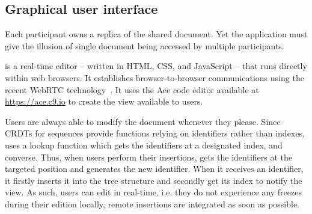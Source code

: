 \subsection{Graphical user interface}

Each participant owns a replica of the shared document. Yet the application must
give the illusion of single document being accessed by multiple
participants.

\CRATE is a real-time editor -- written in HTML, CSS, and JavaScript -- that
runs directly within web browsers. It establishes browser-to-browser
communications using the recent WebRTC technology~\cite{webrtc}. It uses the Ace
code editor available at \url{https://ace.c9.io} to create the view available to
users.

Users are always able to modify the document whenever they please.  Since CRDTs
for sequences provide functions relying on identifiers rather than indexes,
\CRATE uses a lookup function which gets the identifiers at a designated index,
and converse.  Thus, when users perform their insertions, \CRATE gets the
identifiers at the targeted position and generates the new identifier. When it
receives an identifier, it firstly inserts it into the tree structure and
secondly get its index to notify the view. As such, users can edit in real-time,
i.e. they do not experience any freezes during their edition locally, remote
insertions are integrated as soon as possible.



